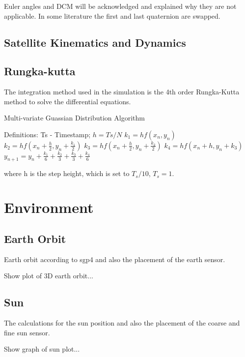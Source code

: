 Euler angles and DCM will be acknowledged and explained why they are not applicable.
In some literature the first and last quaternion are swapped.

\subsection{Satellite Kinematics and Dynamics}

\subsection{Rungka-kutta}
The integration method used in the simulation is the 4th order Rungka-Kutta method to solve the differential equations.

\begin{algorithm}[!htb]
	\caption[Multi-variate Guassian Distribution]{Multi-variate Guassian Distribution Algorithm}
	\label{alg}
	\begin{algorithmic}[1]
		\State Definitions: Ts - Timestamp; 
		\State $h = Ts/N$ 
		\State	$k_1 = hf(x_n, y_n)$
		\State	$k_2 = hf(x_n + \frac{h}{2}, y_n + \frac{k_1}{2})$
		\State	$k_3 = hf(x_n + \frac{h}{2}, y_n + \frac{k_2}{2})$
		\State	$k_4 = hf(x_n + h, y_n + k_3)$
		\State	$y_{n+1}=y_n + \frac{k_1}{6} + \frac{k_2}{3} + \frac{k_3}{3} + \frac{k_4}{6}$
		\EndFor

	\end{algorithmic}
\end{algorithm}

where h is the step height, which is set to $T_s/10$, $T_s = 1$. 


\section{Environment}
\subsection{Earth Orbit}
Earth orbit according to sgp4 and also the placement of the earth sensor.

Show plot of 3D earth orbit...

\subsection{Sun}
The calculations for the sun position and also the placement of the coarse and fine sun sensor.

Show graph of sun plot...

